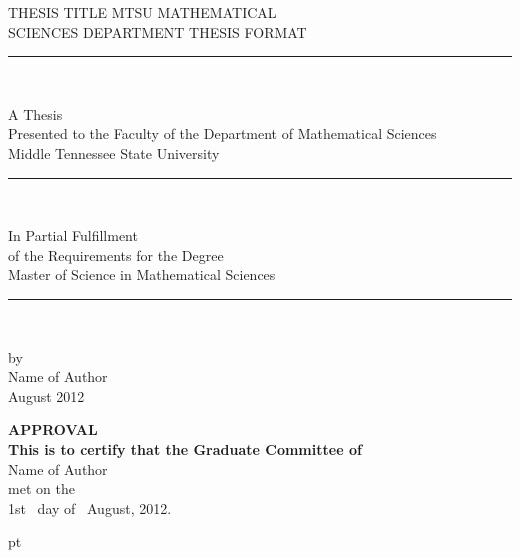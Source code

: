 \documentclass[12pt]{article}
\numberwithin{equation}{section} %
\begin{document}
\pagestyle{empty}

\begin{center}
{THESIS TITLE MTSU MATHEMATICAL  \\
[.10in]
 SCIENCES DEPARTMENT THESIS FORMAT  \\ [.07in]} \rm
\rule{1.25in}{.01in}\\[.0 in]

\vspace{.6in}

A Thesis \\ [.06  in]
Presented to the Faculty of the  Department of Mathematical Sciences \\[.06in]
Middle Tennessee State University \\ [.06in]
\rule{1.25in}{.01in}\\

\vspace{.6in}

In Partial Fulfillment \\[.06 in]
of the Requirements for the Degree \\ [.06 in]
Master of Science in Mathematical Sciences \\ [.06 in]
\rule{1.25in}{.01in}\\

\vspace{.6in}

by  \\ [.06in]
{ Name of Author} \\[.06in]
{August 2012}
\end{center}

\newpage

\pagestyle{plain}

\begin{center}

{\bf APPROVAL} \\ [.05in]
{\bf This is to certify that the Graduate Committee of }\\
Name of Author \\ [-.1in] met on the \\ [-.1in] 1st \  day of \
August, 2012.
\\ [.25in]
\end{center}

 pt
\end{document}
